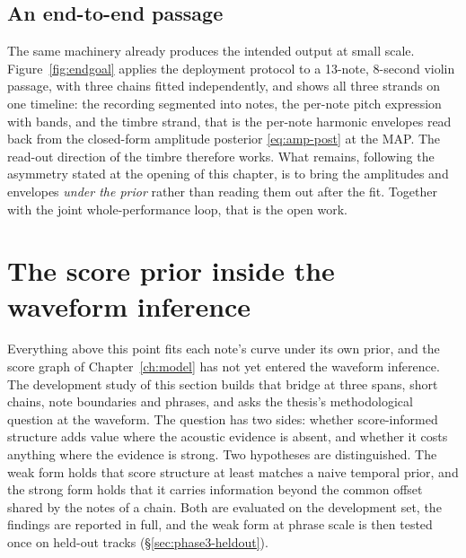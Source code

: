 \subsection{An end-to-end passage}

The same machinery already produces the intended output at small scale.
Figure~\ref{fig:endgoal} applies the deployment protocol to a 13-note,
8-second violin passage, with three chains fitted independently, and shows
all three strands on one timeline: the recording segmented into notes, the
per-note pitch expression with bands, and the timbre strand, that is the
per-note harmonic envelopes read back from the closed-form amplitude
posterior \eqref{eq:amp-post} at the MAP. The read-out direction of the
timbre therefore works. What remains, following the asymmetry stated at the
opening of this chapter, is to bring the amplitudes and envelopes
\emph{under the prior} rather than reading them out after the fit. Together
with the joint whole-performance loop, that is the open work.


\section{The score prior inside the waveform inference}
\label{sec:phase3-priorvalue}
Everything above this point fits each note's curve under its own prior, and
the score graph of Chapter~\ref{ch:model} has not yet entered the waveform
inference. The development study of this section builds that bridge at
three spans, short chains, note boundaries and phrases, and asks the
thesis's methodological question at the waveform. The question has two
sides: whether score-informed structure adds value where the acoustic
evidence is absent, and whether it costs anything where the evidence is
strong. Two hypotheses are distinguished. The weak form holds that score
structure at least matches a naive temporal prior, and the strong form
holds that it carries information beyond the common offset shared by the
notes of a chain. Both are evaluated on the development set, the findings
are reported in full, and the weak form at phrase scale is then tested
once on held-out tracks (\S\ref{sec:phase3-heldout}).

